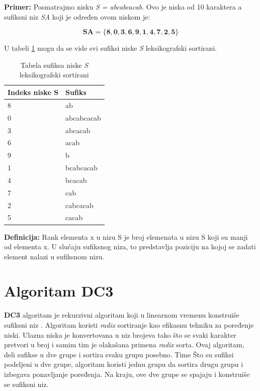 \documentclass{article}
\begin{document}
\textbf{Primer:} Posmatrajmo nisku \textit{S = abcabcacab}. Ovo je niska od 10 karaktera a sufiksni niz \textit{SA} koji je određen ovom niskom je:

\begin{equation}
\mathbf{SA = \{8, 0, 3, 6, 9, 1, 4, 7, 2, 5\}}
\end{equation}

U tabeli \ref{table:1} mogu da se vide svi sufiksi niske \textit{S} leksikografski sortirani.

\begin{table}[h!]
    \begin{center}
        \begin{tabular}{|l|l|} \hline
        \textbf{Indeks niske S} & \textbf{Sufiks}\\ \hline
        8 & ab\\ \hline
        0 & abcabcacab\\ \hline
        3 & abcacab\\ \hline
        6 & acab\\ \hline
        9 & b\\ \hline
        1 & bcabcacab\\ \hline
        4 & bcacab\\ \hline
        7 & cab\\ \hline
        2 & cabcacab\\ \hline
        5 & cacab\\ \hline
        \end{tabular}
        \caption{Tabela sufiksa niske \textit{S} leksikografski sortirani}
        \label{table:1}
    \end{center}
\end{table}

\textbf{Definicija:} Rank elementa x u nizu S je broj elemenata u nizu S koji su manji od elementa x. U slučaju sufiksnog niza, to predstavlja poziciju na kojoj se zadati element nalazi u sufiksnom nizu.

\section{Algoritam DC3}

\textbf{DC3} algoritam je rekurzivni algoritam koji u linearnom vremenu konstruiše sufiksni niz \cite{sanders_peter, presentation_dc3, master_dc3}. Algoritam koristi \textit{radix} sortiranje kao efikasnu tehniku za poređenje niski. Ulazna niska je konvertovana u niz brojeva tako što se svaki karakter pretvori u broj i samim tim je olakašana primena \textit{radix} sorta. Ovaj algoritam, deli sufikse u dve grupe i sortira svaku grupu posebno. Time Što su sufiksi podeljeni u dve grupe, algoritam koristi jednu grupu da sortira drugu grupu i izbegava ponavljanje poređenja. Na kraju, ove dve grupe se spajaju i konstruiše se sufiksni niz.
\end{document}
